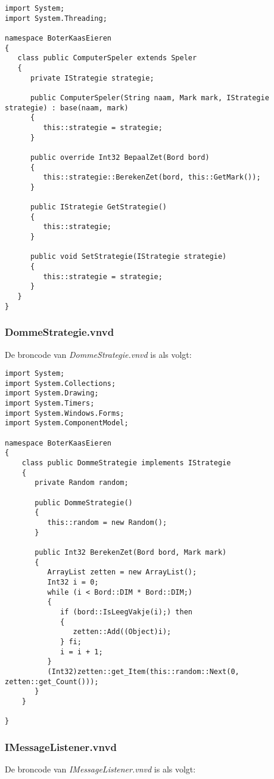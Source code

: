 \begin{lstlisting}
import System;
import System.Threading;

namespace BoterKaasEieren
{
   class public ComputerSpeler extends Speler
   {
      private IStrategie strategie;
      
      public ComputerSpeler(String naam, Mark mark, IStrategie strategie) : base(naam, mark)
      {
         this::strategie = strategie;
      }
      
      public override Int32 BepaalZet(Bord bord)
      {
         this::strategie::BerekenZet(bord, this::GetMark());
      }
      
      public IStrategie GetStrategie()
      {
         this::strategie;
      }
      
      public void SetStrategie(IStrategie strategie)
      {
         this::strategie = strategie;
      }
   }
}
\end{lstlisting}

\subsubsection{DommeStrategie.vnvd}
De broncode van \textit{DommeStrategie.vnvd} is als volgt:

\begin{lstlisting}
import System;
import System.Collections;
import System.Drawing;
import System.Timers;
import System.Windows.Forms;
import System.ComponentModel;

namespace BoterKaasEieren
{
	class public DommeStrategie implements IStrategie
	{
	   private Random random;
	   
	   public DommeStrategie()
	   {
	      this::random = new Random();
	   }
	   
	   public Int32 BerekenZet(Bord bord, Mark mark)
	   {
	      ArrayList zetten = new ArrayList();
	      Int32 i = 0;
	      while (i < Bord::DIM * Bord::DIM;)
	      {
	         if (bord::IsLeegVakje(i);) then
	         {
	            zetten::Add((Object)i);
	         } fi;
	         i = i + 1;
	      }
	      (Int32)zetten::get_Item(this::random::Next(0, zetten::get_Count()));
	   }
	}

}
\end{lstlisting}

\subsubsection{IMessageListener.vnvd}
De broncode van \textit{IMessageListener.vnvd} is als volgt:

